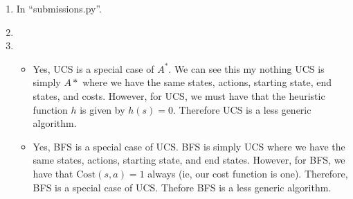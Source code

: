 \documentclass[12pt]{article}
\begin{document}
\begin{enumerate}[label=(\alph*)]
  \item In ``submissions.py''.
  \item
  \item 
  \begin{itemize}
    \item Yes, UCS is a special case of $A^*$. We can see this my nothing UCS is simply $A*$ where we have the same states, actions, starting state, end states, and costs. However, for UCS, we must have that the heuristic function $h$ is given by $h(s) = 0$. Therefore UCS is a less generic algorithm.
    \item Yes, BFS is a special case of UCS. BFS is simply UCS where we have the same states, actions, starting state, and end states. However, for BFS, we have that $\text{Cost}(s,a) = 1$ always (ie, our cost function is one). Therefore, BFS is a special case of UCS. Thefore BFS is a less generic algorithm.
  \end{itemize}
\end{enumerate}
\end{document}
